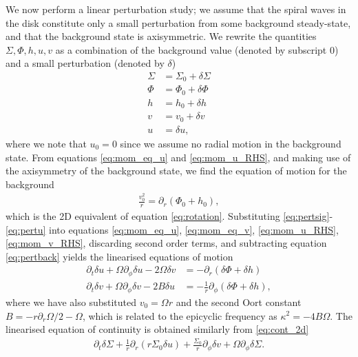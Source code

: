 We now perform a linear perturbation study; we assume that the spiral waves in the disk constitute only a small perturbation from some background steady-state, and that the background state is axisymmetric.
We rewrite the quantities $\Sigma,\Phi,h,u,v$ as a combination of the background value (denoted by subscript 0) and a small perturbation  (denoted by $\delta$)
\begin{align}
    \Sigma &= \Sigma_0 + \delta\Sigma \label{eq:pertsig} \\
    \Phi &= \Phi_0 + \delta\Phi \label{eq:pertphi} \\
    h &= h_0 + \delta h \label{eq:perth} \\
    v &= v_0 + \delta v \label{eq:pertv} \\ 
    u &= \delta u, \label{eq:pertu}
\end{align}
where we note that $u_0=0$ since we assume no radial motion in the background state.
From equations \ref{eq:mom_eq_u} and \ref{eq:mom_u_RHS}, and making use of the axisymmetry of the background state, we find the equation of motion for the background
\begin{align}
    \frac{v_0^2}{r} = \partial_r \left( \Phi_0 + h_0  \right), \label{eq:pertback}
\end{align}
which is the 2D equivalent of equation \ref{eq:rotation}. 
Substituting \ref{eq:pertsig}-\ref{eq:pertu} into equations \ref{eq:mom_eq_u}, \ref{eq:mom_eq_v}, \ref{eq:mom_u_RHS}, \ref{eq:mom_v_RHS}, discarding second order terms, and subtracting equation \ref{eq:pertback} yields the linearised equations of motion 
\begin{align}
    \partial_t \delta u + \Omega \partial_\phi \delta u - 2 \Omega \delta v &= - \partial_r \left( \delta \Phi + \delta h  \right) \label{eq:mom_u_lin} \\
    \partial_t \delta v + \Omega \partial_\phi \delta v - 2 B \delta u &= - \frac{1}{r} \partial_\phi \left( \delta \Phi + \delta h  \right), \label{eq:mom_v_lin}
\end{align}
where we have also substituted $v_0=\Omega r$ and the second Oort constant $B = -r \partial_r \Omega / 2 -\Omega$, which is related to the epicyclic frequency as $\kappa^2 = -4 B \Omega$. 
The linearised equation of continuity is obtained similarly from \ref{eq:cont_2d}
\begin{align}
    \partial_t \delta \Sigma + \frac{1}{r} \partial_r \left( r \Sigma_0 \delta u  \right) + \frac{\Sigma_0}{r} \partial_\phi \delta v + \Omega \partial_\phi \delta \Sigma. \label{eq:cont_lin}
\end{align}
